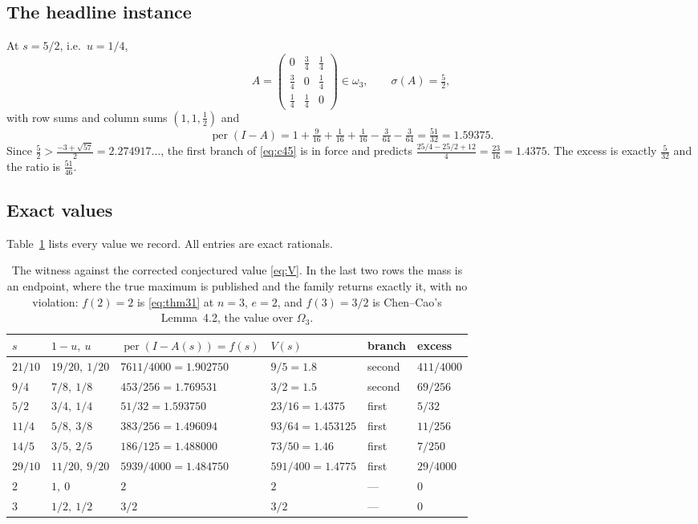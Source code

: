 \documentclass[11pt]{amsart}
\theoremstyle{remark}
\DeclareMathOperator{\per}{per}
\newcommand{\ws}{\omega}
\begin{document}
\subsection*{The headline instance}
At $s=5/2$, i.e.\ $u=1/4$,
\[
 A=\begin{pmatrix}0&\tfrac34&\tfrac14\\[2pt] \tfrac34&0&\tfrac14\\[2pt]
   \tfrac14&\tfrac14&0\end{pmatrix}\in\ws_3,
 \qquad
 \sigma(A)=\tfrac52,
\]
with row sums and column sums $(1,1,\tfrac12)$ and
\[
 \per(I-A)=1+\tfrac9{16}+\tfrac1{16}+\tfrac1{16}-\tfrac3{64}-\tfrac3{64}
 =\tfrac{51}{32}=1.59375 .
\]
Since $\tfrac52>\tfrac{-3+\sqrt{57}}2=2.274917\ldots$, the first branch of
\eqref{eq:c45} is in force and predicts $\tfrac{25/4-25/2+12}{4}=\tfrac{23}{16}
=1.4375$. The excess is exactly $\tfrac5{32}$ and the ratio is $\tfrac{51}{46}$.

\subsection*{Exact values}
Table~\ref{tab:inst} lists every value we record. All entries are exact rationals.

\begin{table}[ht]
\small
\begin{tabular}{llllll}
\hline
$s$ & $1-u,\ u$ & $\per(I-A(s))=f(s)$ & $V(s)$ & branch & excess\\
\hline
$21/10$ & $19/20,\ 1/20$ & $7611/4000=1.902750$ & $9/5=1.8$ & second & $411/4000$\\
$9/4$   & $7/8,\ 1/8$    & $453/256=1.769531$   & $3/2=1.5$ & second & $69/256$\\
$5/2$   & $3/4,\ 1/4$    & $51/32=1.593750$     & $23/16=1.4375$ & first & $5/32$\\
$11/4$  & $5/8,\ 3/8$    & $383/256=1.496094$   & $93/64=1.453125$ & first & $11/256$\\
$14/5$  & $3/5,\ 2/5$    & $186/125=1.488000$   & $73/50=1.46$ & first & $7/250$\\
$29/10$ & $11/20,\ 9/20$ & $5939/4000=1.484750$ & $591/400=1.4775$ & first & $29/4000$\\
$2$ & $1,\ 0$ & $2$ & $2$ & --- & $0$\\
$3$ & $1/2,\ 1/2$ & $3/2$ & $3/2$ & --- & $0$\\
\hline
\end{tabular}
\medskip
\caption{The witness against the corrected conjectured value \eqref{eq:V}. In the last
two rows the mass is an endpoint, where the true maximum is published and the family
returns exactly it, with no violation: $f(2)=2$ is \eqref{eq:thm31} at $n=3$, $e=2$,
and $f(3)=3/2$ is Chen--Cao's Lemma~4.2, the value over $\Omega_3$.}
\label{tab:inst}
\end{table}
\end{document}
